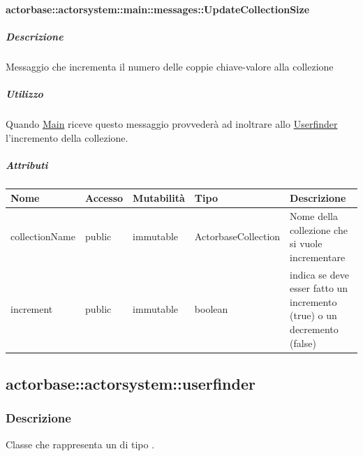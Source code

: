 \documentclass{scalatekids-article}
\begin{document}
\paragraph{actorbase::actorsystem::main::messages::UpdateCollectionSize}
\label{sec:actorbase::actorsystem::main::messages::UpdateCollectionSize}

\subparagraph{Descrizione}

Messaggio che incrementa il numero delle coppie chiave-valore alla collezione

\subparagraph{Utilizzo}

Quando \hyperref[sec:actorbase::actorsystem::main::Main]{Main}
riceve questo messaggio provvederà ad inoltrare allo \hyperref[sec:actorbase::actorsystem::userfinder::Userfinder]{Userfinder} l'incremento della collezione.

\subparagraph{Attributi}
\begin{tabular}{| p{3cm} | p{1.5cm} | p{2cm} | p{2cm} | p{8.5cm} |}
  \hline
  Nome & Accesso & Mutabilità & Tipo & Descrizione\\
  \hline
  collectionName & public & immutable & ActorbaseCollection & Nome della collezione che si vuole incrementare\\
  \hline
  increment & public & immutable & boolean & indica se deve esser fatto un incremento (true) o un decremento (false)\\
  \hline
\end{tabular}


\subsection{actorbase::actorsystem::userfinder} %
\label{sec:actorbase::actorsystem::userfinder}


\subsubsection{Descrizione}
Classe che rappresenta un  di tipo .
\end{document}
